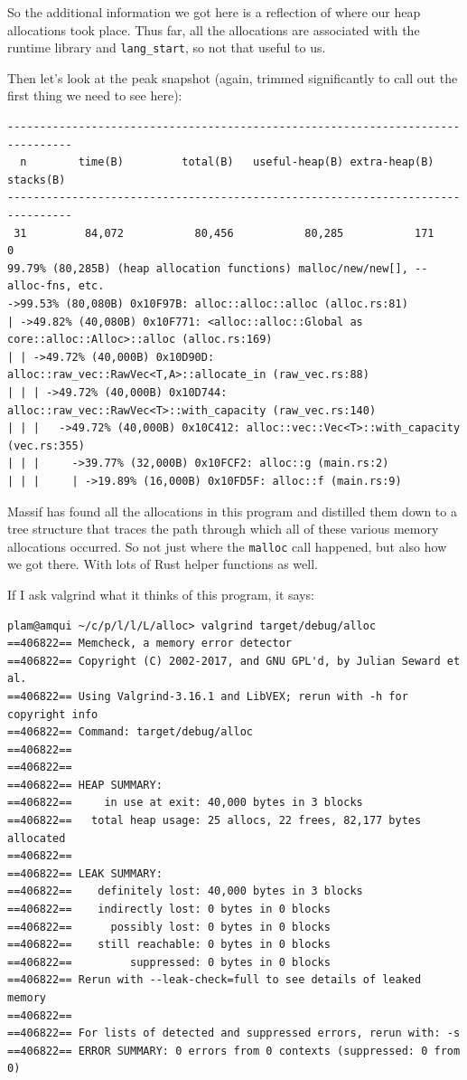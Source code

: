 \documentclass[a4paper]{report}
\begin{document}
So the additional information we got here is a reflection of where our heap allocations took place. Thus far, all the allocations are associated with the runtime library and {\tt lang\_start}, so not that useful to us.

Then let's look at the peak snapshot (again, trimmed significantly to call out the first thing we need to see here):

{
\begin{verbatim}
--------------------------------------------------------------------------------
  n        time(B)         total(B)   useful-heap(B) extra-heap(B)    stacks(B)
--------------------------------------------------------------------------------
 31         84,072           80,456           80,285           171            0
99.79% (80,285B) (heap allocation functions) malloc/new/new[], --alloc-fns, etc.
->99.53% (80,080B) 0x10F97B: alloc::alloc::alloc (alloc.rs:81)
| ->49.82% (40,080B) 0x10F771: <alloc::alloc::Global as core::alloc::Alloc>::alloc (alloc.rs:169)
| | ->49.72% (40,000B) 0x10D90D: alloc::raw_vec::RawVec<T,A>::allocate_in (raw_vec.rs:88)
| | | ->49.72% (40,000B) 0x10D744: alloc::raw_vec::RawVec<T>::with_capacity (raw_vec.rs:140)
| | |   ->49.72% (40,000B) 0x10C412: alloc::vec::Vec<T>::with_capacity (vec.rs:355)
| | |     ->39.77% (32,000B) 0x10FCF2: alloc::g (main.rs:2)
| | |     | ->19.89% (16,000B) 0x10FD5F: alloc::f (main.rs:9)
\end{verbatim}
}

Massif has found all the allocations in this program and distilled them down to a tree structure that traces the path through which all of these various memory allocations occurred. So not just where the \texttt{malloc} call happened, but also how we got there. With lots of Rust helper functions as well.

If I ask valgrind what it thinks of this program, it says:

{\scriptsize
\begin{verbatim}
plam@amqui ~/c/p/l/l/L/alloc> valgrind target/debug/alloc
==406822== Memcheck, a memory error detector
==406822== Copyright (C) 2002-2017, and GNU GPL'd, by Julian Seward et al.
==406822== Using Valgrind-3.16.1 and LibVEX; rerun with -h for copyright info
==406822== Command: target/debug/alloc
==406822== 
==406822== 
==406822== HEAP SUMMARY:
==406822==     in use at exit: 40,000 bytes in 3 blocks
==406822==   total heap usage: 25 allocs, 22 frees, 82,177 bytes allocated
==406822== 
==406822== LEAK SUMMARY:
==406822==    definitely lost: 40,000 bytes in 3 blocks
==406822==    indirectly lost: 0 bytes in 0 blocks
==406822==      possibly lost: 0 bytes in 0 blocks
==406822==    still reachable: 0 bytes in 0 blocks
==406822==         suppressed: 0 bytes in 0 blocks
==406822== Rerun with --leak-check=full to see details of leaked memory
==406822== 
==406822== For lists of detected and suppressed errors, rerun with: -s
==406822== ERROR SUMMARY: 0 errors from 0 contexts (suppressed: 0 from 0)
\end{verbatim}
}
\end{document}
